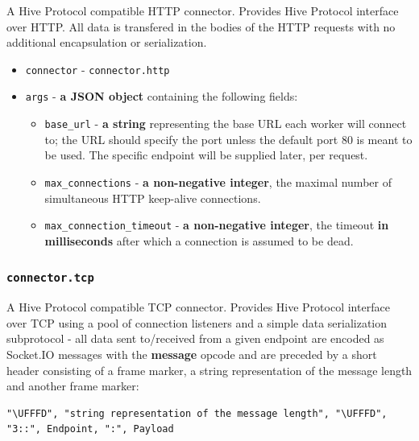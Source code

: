 \documentclass[a4paper]{article}
\begin{document}
A Hive Protocol compatible HTTP connector. Provides Hive Protocol interface over HTTP. All data is transfered in the bodies of the HTTP requests with no additional encapsulation or serialization.


\begin{itemize}
\item \texttt{connector} - \texttt{connector.http}
\item \texttt{args} - \textbf{a JSON object} containing the following fields:
\begin{itemize}
\item \texttt{base\_url} - \textbf{a string} representing the base URL each worker will connect to; the URL should specify the port unless the default port 80 is meant to be used. The specific endpoint will be supplied later, per request.
\item \texttt{max\_connections} - \textbf{a non-negative integer}, the maximal number of simultaneous HTTP keep-alive connections.
\item \texttt{max\_connection\_timeout} - \textbf{a non-negative integer}, the timeout \textbf{in milliseconds} after which a connection is assumed to be dead.
\end{itemize}
\end{itemize}
\subsubsection{\texttt{connector.tcp}}
\label{sec-8-4-3}

A Hive Protocol compatible TCP connector. Provides Hive Protocol interface over TCP using a pool of connection listeners and a simple data serialization subprotocol - all data sent to/received from a given endpoint are encoded as Socket.IO messages with the \textbf{message} opcode and are preceded by a short header consisting of a frame marker, a string representation of the message length and another frame marker:


\begin{verbatim}
"\UFFFD", "string representation of the message length", "\UFFFD", "3::", Endpoint, ":", Payload
\end{verbatim}
\end{document}
